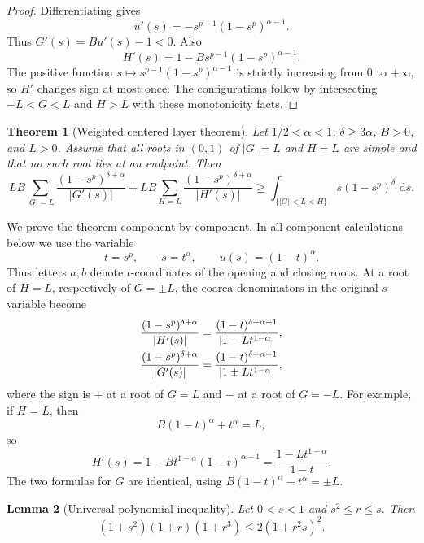 \documentclass[pdflatex,sn-mathphys-num]{sn-jnl}
\numberwithin{equation}{section}
\theoremstyle{thmstyleone}
\newtheorem{theorem}{Theorem}[section]
\newtheorem{lemma}[theorem]{Lemma}
\theoremstyle{thmstylethree}
\newcommand{\1}{\mathbf{1}}
\newcommand{\dd}{\,\mathrm{d}}
\begin{document}
\begin{proof}
Differentiating gives
\[
 u'(s)=-s^{p-1}(1-s^p)^{\alpha-1}.
\]
Thus $G'(s)=Bu'(s)-1<0$. Also
\[
 H'(s)=1-Bs^{p-1}(1-s^p)^{\alpha-1}.
\]
The positive function $s\mapsto s^{p-1}(1-s^p)^{\alpha-1}$ is strictly increasing from $0$ to $+\infty$, so $H'$ changes sign at most once. The configurations follow by intersecting $-L<G<L$ and $H>L$ with these monotonicity facts.
\end{proof}

\begin{theorem}[Weighted centered layer theorem]\label{thm:app-wcl}
Let $1/2<\alpha<1$, $\delta\ge3\alpha$, $B>0$, and $L>0$.
Assume that all roots in $(0,1)$ of $|G|=L$ and $H=L$ are simple and
that no such root lies at an endpoint. Then
\begin{equation}\label{eq:app-wcl}
 LB\sum_{|G|=L}\frac{(1-s^p)^{\delta+\alpha}}{|G'(s)|}
 +LB\sum_{H=L}\frac{(1-s^p)^{\delta+\alpha}}{|H'(s)|}
 \ge
 \int_{\{|G|<L<H\}}s(1-s^p)^\delta\,\dd s.
\end{equation}
\end{theorem}

We prove the theorem component by component. In all component calculations below we use the variable
\[
 t=s^p,
 \qquad s=t^\alpha,
 \qquad u(s)=(1-t)^\alpha.
\]
Thus letters $a,b$ denote $t$-coordinates of the opening and closing roots. At a root of $H=L$, respectively of $G=\pm L$, the coarea denominators in the original $s$-variable become
\begin{align}\label{eq:app-endpoint-denominators}
 \frac{(1-s^p)^{\delta+\alpha}}{|H'(s)|}
 &=\frac{(1-t)^{\delta+\alpha+1}}{|1-Lt^{1-\alpha}|},\notag\\
 \frac{(1-s^p)^{\delta+\alpha}}{|G'(s)|}
 &=\frac{(1-t)^{\delta+\alpha+1}}{|1\pm Lt^{1-\alpha}|},
\end{align}
where the sign is $+$ at a root of $G=L$ and $-$ at a root of $G=-L$. For example, if $H=L$, then
\[
 B(1-t)^\alpha+t^\alpha=L,
\]
so
\[
 H'(s)=1-Bt^{1-\alpha}(1-t)^{\alpha-1}
 =\frac{1-Lt^{1-\alpha}}{1-t}.
\]
The two formulas for $G$ are identical, using $B(1-t)^\alpha-t^\alpha=\pm L$.

\begin{lemma}[Universal polynomial inequality]\label{lem:app-poly}
Let $0<s<1$ and $s^2\le r\le s$. Then
\begin{equation}\label{eq:app-poly-ineq}
 (1+s^2)(1+r)(1+r^3)\le2(1+r^2s)^2.
\end{equation}
\end{lemma}
\end{document}
